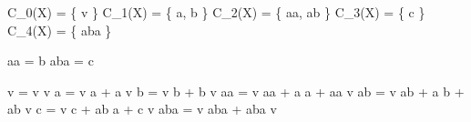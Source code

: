 
C_{0}(X) = \{ v \}
C_{1}(X) = \{ a, b \}
C_{2}(X) = \{ aa, ab \}
C_{3}(X) = \{ c \}
C_{4}(X) = \{ aba \}

\partial aa = b
\partial aba = c

\Delta v = v \otimes v
\Delta a = v \otimes a + a \otimes v
\Delta b = v \otimes b + b \otimes v
\Delta aa = v \otimes aa + a \otimes a + aa \otimes v
\Delta ab = v \otimes ab + a \otimes b + ab \otimes v
\Delta c = v \otimes c + ab \otimes a + c \otimes v
\Delta aba = v \otimes aba + aba \otimes v